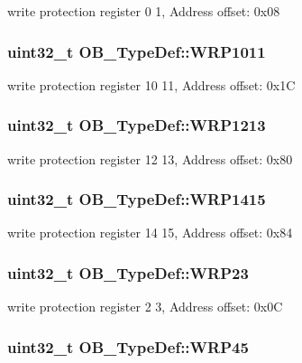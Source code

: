 write protection register 0 1, Address offset\-: 0x08 \hypertarget{struct_o_b___type_def_a654f411ab93f1115801fae502576f983}{
\subsubsection[{W\-R\-P1011}]{ uint32\-\_\-t O\-B\-\_\-\-Type\-Def\-::\-W\-R\-P1011}}\label{struct_o_b___type_def_a654f411ab93f1115801fae502576f983}
write protection register 10 11, Address offset\-: 0x1\-C \hypertarget{struct_o_b___type_def_a18778e034221d6d0faf533b0304c6ab6}{
\subsubsection[{W\-R\-P1213}]{ uint32\-\_\-t O\-B\-\_\-\-Type\-Def\-::\-W\-R\-P1213}}\label{struct_o_b___type_def_a18778e034221d6d0faf533b0304c6ab6}
write protection register 12 13, Address offset\-: 0x80 \hypertarget{struct_o_b___type_def_a099ecaa23da9e2aa5da40e7d8cacc2fc}{
\subsubsection[{W\-R\-P1415}]{ uint32\-\_\-t O\-B\-\_\-\-Type\-Def\-::\-W\-R\-P1415}}\label{struct_o_b___type_def_a099ecaa23da9e2aa5da40e7d8cacc2fc}
write protection register 14 15, Address offset\-: 0x84 \hypertarget{struct_o_b___type_def_acaba2c9c4bd8bebe7b72f8ffc0bee63d}{
\subsubsection[{W\-R\-P23}]{ uint32\-\_\-t O\-B\-\_\-\-Type\-Def\-::\-W\-R\-P23}}\label{struct_o_b___type_def_acaba2c9c4bd8bebe7b72f8ffc0bee63d}
write protection register 2 3, Address offset\-: 0x0\-C \hypertarget{struct_o_b___type_def_a7e9fb00f640fdadfa2142c85b562467e}{
\subsubsection[{W\-R\-P45}]{ uint32\-\_\-t O\-B\-\_\-\-Type\-Def\-::\-W\-R\-P45}}\label{struct_o_b___type_def_a7e9fb00f640fdadfa2142c85b562467e}
